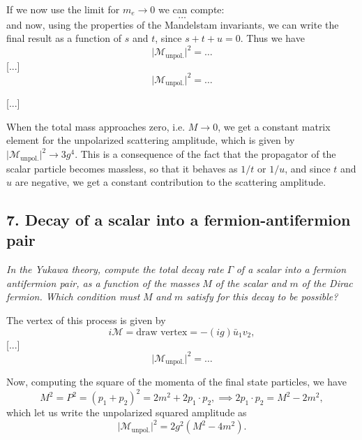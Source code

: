 If we now use the limit for \(m_e \to 0\) we can compte:
\[
    \dots
\]
and now, using the properties of the Mandelstam invariants, we can write the final result as a function of \(s\) and \(t\), since \(s + t + u = 0\). Thus we have
\[
    \vert \mathcal{M}_{\text{unpol.}} \vert^2 = \dots
\]
[...]
\[
    \vert \mathcal{M}_{\text{unpol.}} \vert^2 = \dots
\]

[...]

\begin{remark}
    When the total mass approaches zero, i.e. \(M \to 0\), we get a constant matrix element for the unpolarized scattering amplitude, which is given by \(\vert \mathcal{M}_{\text{unpol.}} \vert^2 \to 3 g^4\). This is a consequence of the fact that the propagator of the scalar particle becomes massless, so that it behaves as \(1/t\) or \(1/u\), and since \(t\) and \(u\) are negative, we get a constant contribution to the scattering amplitude.
\end{remark}

\subsection*{7. Decay of a scalar into a fermion-antifermion pair}

\begin{center}
    \textit{In the Yukawa theory, compute the total decay rate} \( \Gamma \) \textit{of a scalar into a fermion antifermion pair, as a function of the masses} \(M\) \textit{of the scalar and} \(m\) \textit{of the Dirac fermion. Which condition must} \(M\) \textit{and} \(m\) \textit{satisfy for this decay to be possible?}
\end{center}

The vertex of this process is given by
\[
    i \mathcal{M} = \text{draw vertex} = -(ig) \bar{u}_1 v_2,
\]
[...]
\[
    \vert \mathcal{M}_{\text{unpol.}} \vert^2 = \dots
\]

Now, computing the square of the momenta of the final state particles, we have
\[
    M^2 = P^2 = (p_1 + p_2)^2 = 2m^2 + 2 p_1 \cdot p_2, \implies 2 p_1 \cdot p_2 = M^2 - 2m^2,
\]
which let us write the unpolarized squared amplitude as
\[
    \vert \mathcal{M}_{\text{unpol.}} \vert^2 = 2 g^2 (M^2 - 4 m^2).
\]

